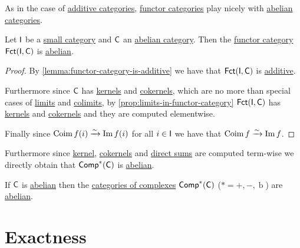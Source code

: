 \documentclass[../../main]{subfiles}
\begin{document}
As in the case of \hyperref[def:additive-category]{additive categories}, \hyperref[def:functor-category]{functor categories} play nicely with \hyperref[def:abelian-category]{abelian categories}.

\begin{proposition}\label{prop:functor-category-is-abelian}
  Let \(\category{I}\) be a \hyperref[def:small-category]{small category} and \(\category{C}\) an \hyperref[def:abelian-category]{abelian category}.
  Then the \hyperref[def:functor-category]{functor category} \(\Fct{\category{I}}{\category{C}}\) is \hyperref[def:abelian-category]{abelian}.
\end{proposition}
\begin{proof}
  By \autoref{lemma:functor-category-is-additive} we have that \(\Fct{\category{I}}{\category{C}}\) is \hyperref[def:additive-category]{additive}.
  
  Furthermore since \(\category{C}\) has \hyperref[def:categorical-kernel]{kernels} and \hyperref[def:categorical-cokernel]{cokernels}, which are no more than special cases of \hyperref[def:categorical-limit]{limits} and \hyperref[def:categorical-colimit]{colimits}, by \autoref{prop:limits-in-functor-category} \(\Fct{\category{I}}{\category{C}}\) has \hyperref[def:categorical-kernel]{kernels} and \hyperref[def:categorical-cokernel]{cokernels} and they are computed elementwise.

  Finally since \(\operatorname{Coim} f(i) \isoarrow \operatorname{Im} f(i)\) for all \(i \in \category{I}\) we have that \(\operatorname{Coim} f \isoarrow \operatorname{Im} f\).
\end{proof}

Furthermore since \hyperref[def:categorical-kernel]{kernel}, \hyperref[def:categorical-cokernel]{cokernels} and \hyperref[def:direct-sum]{direct sums} are computed term-wise we directly obtain that \(\Complex[\ast]{\category{C}}\) is \hyperref[def:abelian-category]{abelian}.
\begin{corollary}\label{cor:complex-category-is-abelian}
  If \(\category{C}\) is \hyperref[def:abelian-category]{abelian} then the \hyperref[def:complex]{categories of complexes} \(\Complex[\ast]{\category{C}}\) (\(\ast = +, -, \operatorname{b}\)) are \hyperref[def:abelian-category]{abelian}.
\end{corollary}

\section{Exactness}
\end{document}
